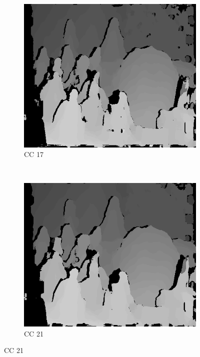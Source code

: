 \begin{figure}
\begin{subfigure}[b]{0.23\textwidth}
    \centering
    \includegraphics[width=\textwidth]{images/stereo-pairs/cones_dual_crosschecked_17.png}
    \caption{CC 17}
  \end{subfigure}
  ~
  \begin{subfigure}[b]{0.23\textwidth}
    \centering
    \includegraphics[width=\textwidth]{images/stereo-pairs/cones_dual_crosschecked_21.png}
    \caption{CC 21}
  \end{subfigure}


\end{figure}
